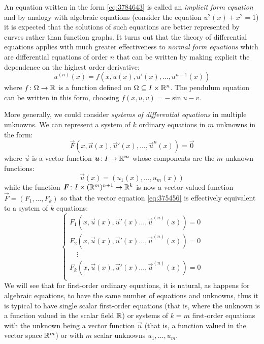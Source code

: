 An equation written in the form \eqref{eq:3784643} is called an \emph{implicit
form equation}
%
%
and by analogy with algebraic equations (consider the equation
$u^2(x) + x^2 = 1$) it is expected that the solutions of such equations are
better represented by curves rather than function graphs.
It turns out that the theory of differential equations applies with
much greater effectiveness to \emph{normal form equations}
which are differential equations of order $n$ that can be written
by making explicit the dependence on the highest order derivative:
\begin{equation}\label{eq:366793}
 u^{(n)}(x) = f(x, u(x), u'(x), \dots, u^{n-1}(x))
\end{equation}
where $f\colon \Omega \to {\mathbb R}$ is a function defined on $\Omega\subseteq I\times
{\mathbb R}^n$.
The pendulum equation can be written in this form,
choosing $f(x,u,v) = -\sin u - v$.

More generally, we could consider
\emph{systems of differential equations}
%
%
%
in multiple unknowns.
We can represent a system of $k$ ordinary equations in $m$ unknowns in the form:
\begin{equation}\label{eq:375456}
  \vec F(x, \vec u(x), \vec u'(x), \dots, \vec u^{n}(x)) = \vec 0
\end{equation}
where $\vec u$ is a vector function $\boldsymbol u \colon I \to {\mathbb R}^m$ 
whose components are the $m$ unknown functions:
\[
  \vec u(x) = (u_1(x), \dots, u_m(x))
\]
while the function $\boldsymbol F \colon I \times ({\mathbb R}^m)^{n+1} \to {\mathbb R}^k$ is now
a vector-valued function $\vec F = (F_1, \dots, F_k)$ so that the vector
equation
\eqref{eq:375456} is effectively equivalent to a system of $k$ equations:
\[
\begin{cases}
F_1(x,\vec u(x), \vec u'(x)\dots, \vec u^{(n)}(x)) = 0\\
F_2(x,\vec u(x), \vec u'(x)\dots, \vec u^{(n)}(x)) = 0\\
\quad\vdots \\
F_k(x,\vec u(x), \vec u'(x)\dots, \vec u^{(n)}(x)) = 0\\
\end{cases}
\]
We will see that for first-order ordinary equations, it is natural,
as happens for algebraic equations,
to have the same number of equations and unknowns, thus it is typical to have
single
scalar first-order equations
(that is, where the unknown is a function valued in the scalar field
${\mathbb R}$)
or systems of $k=m$ first-order equations with the unknown being a vector
function
$\vec u$ (that is, a function valued in the vector space ${\mathbb R}^m$)
or with $m$ scalar unknowns $u_1,\dots, u_m$.

